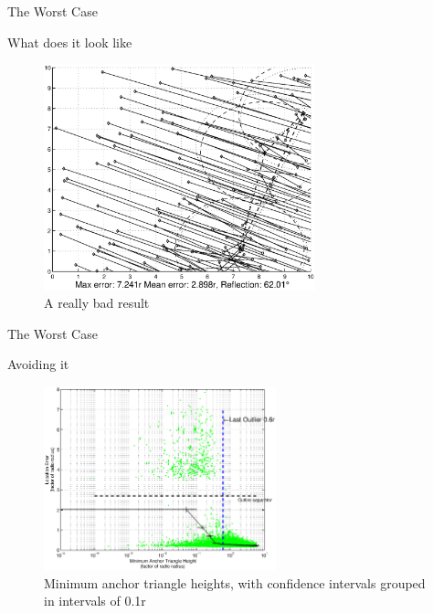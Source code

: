\documentclass{beamer}
\begin{document}
\begin{frame}{The Worst Case}
\begin{block}{What does it look like}
\begin{figure}
	\centering
		\includegraphics[width=0.7\textwidth]{AS6NetworkDiff9}
		\caption{A really bad result}
\end{figure}
\end{block}
\end{frame}

\begin{frame}{The Worst Case}
\begin{block}{Avoiding it}
\begin{figure}
  \centering
	\includegraphics[width=0.6\textwidth]{HeightIndicator_square}
	\caption{Minimum anchor triangle heights, with confidence intervals grouped in intervals of 0.1r}	
\end{figure}
\end{block}
\end{frame}
\end{document}
